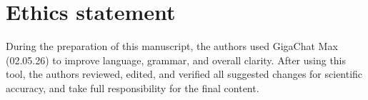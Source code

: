 \section{Ethics statement}

During the preparation of this manuscript, the authors used GigaChat Max (02.05.26) to improve language, grammar, and overall clarity. After using this tool, the authors reviewed, edited, and verified all suggested changes for scientific accuracy, and take full responsibility for the final content.